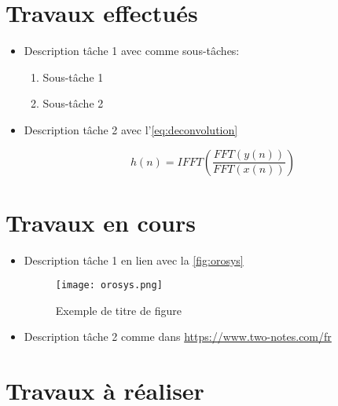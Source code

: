 \documentclass[12pt, a4paper]{article}
\begin{document}
\section{Travaux effectués}

\begin{itemize}
\item Description tâche 1 avec comme sous-tâches:
	\begin{enumerate}
	\item Sous-tâche 1
	\item Sous-tâche 2	
	\end{enumerate}
\item Description tâche 2 avec l'\autoref{eq:deconvolution}

\begin{equation}
    \label{eq:deconvolution}
    h(n) = IFFT \left( \frac{FFT(y(n))}{FFT(x(n))} \right)
\end{equation}

\end{itemize}

\section{Travaux en cours}

\begin{itemize}
\item Description tâche 1 en lien avec la \autoref{fig:orosys}

\begin{figure}[h!]
\centering
\texttt{[image: orosys.png]}
\caption{Exemple de titre de figure}
\label{fig:orosys}
\end{figure}

\item Description tâche 2 comme dans \url{https://www.two-notes.com/fr}

\end{itemize}

\section{Travaux à réaliser}
\end{document}
